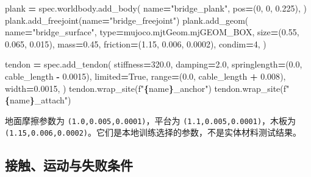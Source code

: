 \documentclass[
  chinese,
  11pt,
  letterpaper,
]{article}
\newenvironment{Shaded}{\begin{snugshade}}{\end{snugshade}}
\newcommand{\BuiltInTok}[1]{#1}
\newcommand{\DecValTok}[1]{\textcolor[rgb]{0.00,0.00,0.81}{#1}}
\newcommand{\FloatTok}[1]{\textcolor[rgb]{0.00,0.00,0.81}{#1}}
\newcommand{\NormalTok}[1]{#1}
\newcommand{\OperatorTok}[1]{\textcolor[rgb]{0.81,0.36,0.00}{\textbf{#1}}}
\newcommand{\SpecialCharTok}[1]{\textcolor[rgb]{0.81,0.36,0.00}{\textbf{#1}}}
\newcommand{\SpecialStringTok}[1]{\textcolor[rgb]{0.31,0.60,0.02}{#1}}
\newcommand{\StringTok}[1]{\textcolor[rgb]{0.31,0.60,0.02}{#1}}
\newcommand{\VariableTok}[1]{\textcolor[rgb]{0.00,0.00,0.00}{#1}}
\renewenvironment{Shaded}{\par\smallskip}{\par\smallskip}
\begin{document}
\begin{Shaded}
\begin{Highlighting}[]
\NormalTok{plank }\OperatorTok{=}\NormalTok{ spec.worldbody.add\_body(}
\NormalTok{    name}\OperatorTok{=}\StringTok{"bridge\_plank"}\NormalTok{,}
\NormalTok{    pos}\OperatorTok{=}\NormalTok{(}\DecValTok{0}\NormalTok{, }\DecValTok{0}\NormalTok{, }\FloatTok{0.225}\NormalTok{),}
\NormalTok{)}
\NormalTok{plank.add\_freejoint(name}\OperatorTok{=}\StringTok{"bridge\_freejoint"}\NormalTok{)}
\NormalTok{plank.add\_geom(}
\NormalTok{    name}\OperatorTok{=}\StringTok{"bridge\_surface"}\NormalTok{,}
    \BuiltInTok{type}\OperatorTok{=}\NormalTok{mujoco.mjtGeom.mjGEOM\_BOX,}
\NormalTok{    size}\OperatorTok{=}\NormalTok{(}\FloatTok{0.55}\NormalTok{, }\FloatTok{0.065}\NormalTok{, }\FloatTok{0.015}\NormalTok{),}
\NormalTok{    mass}\OperatorTok{=}\FloatTok{0.45}\NormalTok{,}
\NormalTok{    friction}\OperatorTok{=}\NormalTok{(}\FloatTok{1.15}\NormalTok{, }\FloatTok{0.006}\NormalTok{, }\FloatTok{0.0002}\NormalTok{),}
\NormalTok{    condim}\OperatorTok{=}\DecValTok{4}\NormalTok{,}
\NormalTok{)}

\NormalTok{tendon }\OperatorTok{=}\NormalTok{ spec.add\_tendon(}
\NormalTok{    stiffness}\OperatorTok{=}\FloatTok{320.0}\NormalTok{,}
\NormalTok{    damping}\OperatorTok{=}\FloatTok{2.0}\NormalTok{,}
\NormalTok{    springlength}\OperatorTok{=}\NormalTok{(}\FloatTok{0.0}\NormalTok{, cable\_length }\OperatorTok{{-}} \FloatTok{0.0015}\NormalTok{),}
\NormalTok{    limited}\OperatorTok{=}\VariableTok{True}\NormalTok{,}
    \BuiltInTok{range}\OperatorTok{=}\NormalTok{(}\FloatTok{0.0}\NormalTok{, cable\_length }\OperatorTok{+} \FloatTok{0.008}\NormalTok{),}
\NormalTok{    width}\OperatorTok{=}\FloatTok{0.0015}\NormalTok{,}
\NormalTok{)}
\NormalTok{tendon.wrap\_site(}\SpecialStringTok{f"}\SpecialCharTok{\{}\NormalTok{name}\SpecialCharTok{\}}\SpecialStringTok{\_anchor"}\NormalTok{)}
\NormalTok{tendon.wrap\_site(}\SpecialStringTok{f"}\SpecialCharTok{\{}\NormalTok{name}\SpecialCharTok{\}}\SpecialStringTok{\_attach"}\NormalTok{)}
\end{Highlighting}
\end{Shaded}

地面摩擦参数为 \texttt{(1.0,0.005,0.0001)}，平台为
\texttt{(1.1,0.005,0.0001)}，木板为
\texttt{(1.15,0.006,0.0002)}。它们是本地训练选择的参数，不是实体材料测试结果。

\subsection{接触、运动与失败条件}\label{ux63a5ux89e6ux8fd0ux52a8ux4e0eux5931ux8d25ux6761ux4ef6}
\end{document}
